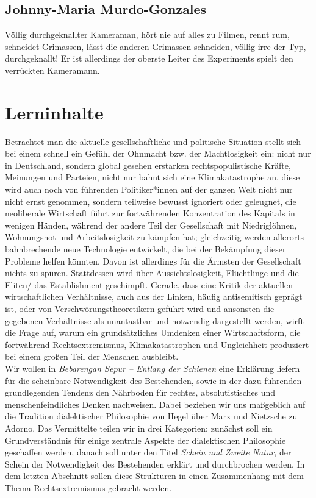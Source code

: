 \documentclass[a4paper, 12pt]{scrartcl}
\begin{document}
    \subsection{Johnny-Maria Murdo-Gonzales}
    Völlig durchgeknallter Kameraman, hört nie auf alles zu Filmen, rennt rum, schneidet Grimassen, lässt die anderen Grimassen schneiden, völlig irre der Typ, durchgeknallt! 
    Er ist allerdings der oberste Leiter des Experiments \glqq spielt\grqq{} den verrückten Kameramann. 


    \section{Lerninhalte}
    Betrachtet man die aktuelle gesellschaftliche und politische Situation stellt sich bei einem  schnell ein Gefühl der  Ohnmacht bzw. der Machtlosigkeit ein: nicht nur in Deutschland, sondern global gesehen erstarken rechtspopulistische Kräfte, Meinungen und Parteien, nicht nur bahnt sich eine Klimakatastrophe an, diese wird auch noch von führenden Politiker*innen auf der ganzen Welt nicht nur nicht ernst genommen, sondern teilweise bewusst ignoriert oder geleugnet, die neoliberale Wirtschaft führt zur fortwährenden Konzentration des Kapitals in wenigen Händen, während der andere Teil der Gesellschaft mit Niedriglöhnen, Wohnungsnot und Arbeitslosigkeit zu kämpfen hat; gleichzeitig werden allerorts bahnbrechende neue Technologie entwickelt, die bei der Bekämpfung dieser Probleme helfen könnten. 
    Davon ist allerdings für die Ärmsten der Gesellschaft nichts zu spüren. Stattdessen wird über Aussichtslosigkeit, Flüchtlinge und die Eliten/ das Establishment geschimpft. Gerade, dass eine Kritik der aktuellen wirtschaftlichen Verhältnisse, auch aus der Linken, häufig antisemitisch geprägt ist, oder von Verschwörungstheoretikern geführt wird und ansonsten die gegebenen Verhältnisse als unantastbar und notwendig dargestellt werden, wirft die Frage auf, warum ein grundsätzliches Umdenken einer Wirtschaftsform, die fortwährend Rechtsextremismus, Klimakatastrophen und Ungleichheit produziert bei einem großen Teil der Menschen ausbleibt. \\
    Wir wollen in \textit{Bebarengan Sepur – Entlang der Schienen} eine Erklärung liefern für die scheinbare Notwendigkeit des Bestehenden, sowie in der dazu führenden grundlegenden Tendenz den Nährboden für rechtes, absolutistisches und menschenfeindliches Denken nachweisen. 
    Dabei beziehen wir uns maßgeblich auf die Tradition dialektischer Philosophie von Hegel über Marx und Nietzsche zu Adorno. 
    Das Vermittelte teilen wir in drei Kategorien: zunächst soll ein Grundverständnis für einige zentrale Aspekte der dialektischen Philosophie geschaffen werden, danach soll unter den Titel \textit{Schein und Zweite Natur}, der Schein der Notwendigkeit des Bestehenden erklärt und durchbrochen werden. 
    In dem letzten Abschnitt sollen diese Strukturen in einen Zusammenhang mit dem Thema Rechtsextremismus gebracht werden.
\end{document}
